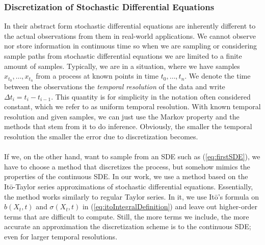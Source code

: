 \subsubsection{Discretization of Stochastic Differential Equations}\label{subsubsec:Discretization}
In their abstract form stochastic differential equations are inherently different to the actual observations from them in real-world applications.
We cannot observe nor store information in continuous time so when we are sampling or considering sample paths from stochastic differential equations we are limited to a finite amount of samples. Typically, we are in a situation, where we have samples $x_{t_0},\dots, x_{t_n}$ from a process at known points in time $t_0,\dots,t_n$. We denote the time between the observations the \textit{temporal resolution} of the data and write $\Delta t_i = t_{i} - t_{i - 1}$. This quantity is for simplicity in the notation often considered constant, which we refer to as uniform temporal resolution. With known temporal resolution and given samples, we can just use the Markov property and the methods that stem from it to do inference. Obviously, the smaller the temporal resolution the smaller the error due to discretization becomes.\\\\
If we, on the other hand, want to sample from an SDE such as (\ref{eq:firstSDE}), we have to choose a method that discretizes the process, but somehow mimics the properties of the continuous SDE. In our work, we use a method based on the Itō-Taylor series approximations of stochastic differential equations. Essentially, the method works similarly to regular Taylor series. In it, we use Itō's formula on $b(X_t, t)$ and $\sigma(X_t, t)$ in (\ref{eq:itoIntegralDefinition}) and leave out higher-order terms that are difficult to compute. Still, the more terms we include, the more accurate an approximation the discretization scheme is to the continuous SDE; even for larger temporal resolutions.

